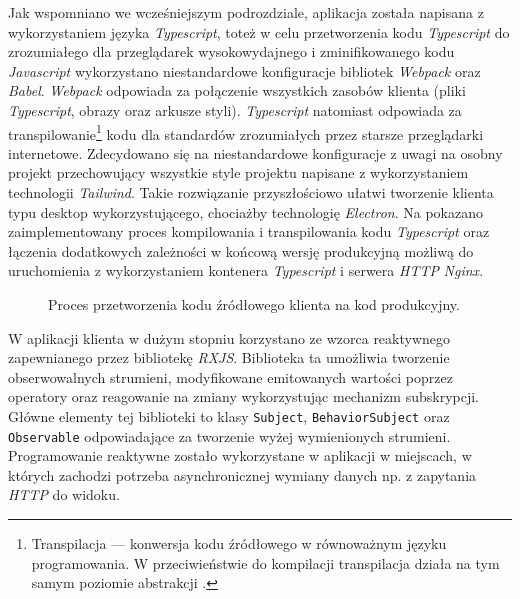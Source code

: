 Jak wspomniano we wcześniejszym podrozdziale, aplikacja została napisana z wykorzystaniem języka \textit{Typescript},
toteż w celu przetworzenia kodu \textit{Typescript} do zrozumiałego dla przeglądarek wysokowydajnego i zminifikowanego
kodu \textit{Javascript} wykorzystano niestandardowe konfiguracje bibliotek \textit{Webpack} oraz \textit{Babel}.
\textit{Webpack} odpowiada za połączenie wszystkich zasobów klienta (pliki \textit{Typescript}, obrazy oraz arkusze
styli). \textit{Typescript} natomiast odpowiada za transpilowanie\footnote{Transpilacja — konwersja kodu źródłowego w
  równoważnym języku programowania. W przeciwieństwie do kompilacji transpilacja działa na tym samym poziomie abstrakcji
  \cite{bib:transpiling}.} kodu dla standardów zrozumiałych przez starsze przeglądarki internetowe. Zdecydowano się na
niestandardowe konfiguracje z uwagi na osobny projekt przechowujący wszystkie style projektu napisane z wykorzystaniem
technologii \textit{Tailwind}. Takie rozwiązanie przyszłościowo ułatwi tworzenie klienta typu desktop wykorzystującego,
chociażby technologię \textit{Electron}. Na  pokazano zaimplementowany proces kompilowania i
transpilowania kodu \textit{Typescript} oraz łączenia dodatkowych zależności w końcową wersję produkcyjną możliwą do
uruchomienia z wykorzystaniem kontenera \textit{Typescript} i serwera \textit{HTTP} \textit{Nginx}.
%
\begin{figure}[H]
  \centering
  \caption{Proces przetworzenia kodu źródłowego klienta na kod produkcyjny.}
  \label{fig:client-compile}
\end{figure}


W aplikacji klienta w dużym stopniu korzystano ze wzorca reaktywnego zapewnianego przez bibliotekę \textit{RXJS}.
Biblioteka ta umożliwia tworzenie obserwowalnych strumieni, modyfikowane emitowanych wartości poprzez operatory oraz
reagowanie na zmiany wykorzystując mechanizm subskrypcji. Główne elementy tej biblioteki to klasy \verb|Subject|,
\verb|BehaviorSubject| oraz \verb|Observable| odpowiadające za tworzenie wyżej wymienionych strumieni. Programowanie
reaktywne zostało wykorzystane w aplikacji w miejscach, w których zachodzi potrzeba asynchronicznej wymiany danych np. z
zapytania \textit{HTTP} do widoku.

